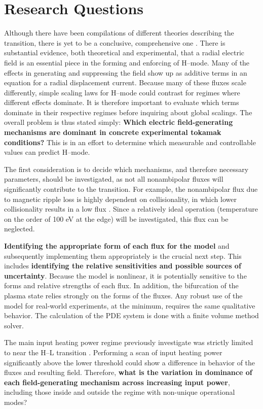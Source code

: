 \section{Research Questions}\label{sec:research_questions}
Although there have been compilations of different theories describing the transition, there is yet to be a conclusive, comprehensive one \cite{connor_review_2000}.
There is substantial evidence, both theoretical and experimental, that a radial electric field is an essential piece in the forming and enforcing of H--mode.
Many of the effects in generating and suppressing the field show up as additive terms in an equation for a radial displacement current.
Because many of these fluxes scale differently, simple scaling laws for H--mode could contrast for regimes where different effects dominate.
It is therefore important to evaluate which terms dominate in their respective regimes before inquiring about global scalings.
The overall problem is thus stated simply: \textbf{Which electric field-generating mechanisms are dominant in concrete experimental tokamak conditions?}
This is in an effort to determine which measurable and controllable values can predict H--mode.

The first consideration is to decide which mechanisms, and therefore necessary parameters, should be investigated, as not all nonambipolar fluxes will significantly contribute to the transition.
For example, the nonambipolar flux due to magnetic ripple loss is highly dependent on collisionality, in which lower collisionality results in a low flux \cite{stringer_effect_1972}.
Since a relatively ideal operation (temperature on the order of 100 eV at the edge) will be investigated, this flux can be neglected.

\textbf{Identifying the appropriate form of each flux for the model} and subsequently implementing them appropriately is the crucial next step.
This includes \textbf{identifying the relative sensitivities and possible sources of uncertainty}.
Because the model is nonlinear, it is potentially sensitive to the forms and relative strengths of each flux.
In addition, the bifurcation of the plasma state relies strongly on the forms of the fluxes.
Any robust use of the model for real-world experiments, at the minimum, requires the same qualitative behavior.
The calculation of the PDE system is done with a finite volume method solver.

The main input heating power regime previously investigate was strictly limited to near the H--L transition \cite{staps_backstepping_2017}.
Performing a scan of input heating power significantly above the lower threshold could show a difference in behavior of the fluxes and resulting field.
Therefore, \textbf{what is the variation in dominance of each field-generating mechanism across increasing input power}, including those inside and outside the regime with non-unique operational modes?

